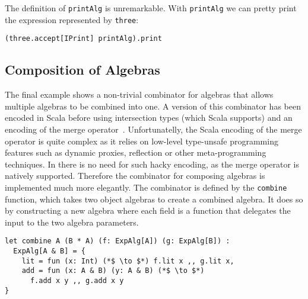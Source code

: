 \noindent The definition of \lstinline{printAlg} is unremarkable.
With \lstinline{printAlg} we can pretty print the expression represented
by \lstinline{three}:

\begin{lstlisting}
(three.accept[IPrint] printAlg).print
\end{lstlisting}

%
\subsection{Composition of Algebras}
The final example shows a non-trivial combinator for algebras that
allows multiple algebras to be combined into one. A version of this
combinator has been encoded in Scala before using intersection types
(which Scala supports) and an encoding of the merge
operator~\cite{oliveira2013feature,rendel14attributes}.
Unfortunatelly, the Scala encoding of the merge operator is quite complex as
it relies on low-level type-unsafe programming features such as
dynamic proxies, reflection or other meta-programming techniques.
In \namedis there is no need for such hacky encoding, as the
merge operator is natively supported. Therefore the combinator for
composing algebras is implemented much more elegantly.
The combinator is defined by the \lstinline$combine$ function, which takes two object algebras to create
a combined algebra. It does so by constructing a new algebra
where each field is a function that delegates the input to the two
algebra parameters.

\begin{lstlisting}
let combine A (B * A) (f: ExpAlg[A]) (g: ExpAlg[B]) :
  ExpAlg[A & B] = {
    lit = fun (x: Int) (*$ \to $*) f.lit x ,, g.lit x,
    add = fun (x: A & B) (y: A & B) (*$ \to $*)
      f.add x y ,, g.add x y
}
\end{lstlisting}

